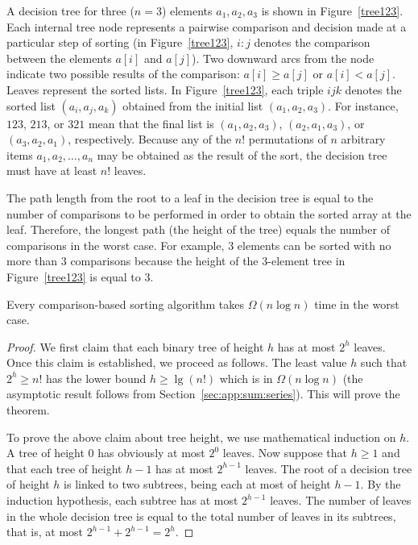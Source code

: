 \begin{Example} A decision tree for three ($n=3$)
elements $a_1, a_2, a_3$ is shown in Figure~\ref{tree123}. 
Each internal tree node represents a pairwise comparison and decision made at a
particular step of sorting (in Figure~\ref{tree123}, $i:j$ denotes 
the comparison between the elements $a[i]$ and $a[j]$). 
Two downward arcs from the node indicate two possible
results of the comparison: $a[i] \geq a[j]$ or $a[i] < a[j]$. 
Leaves represent the sorted lists. In Figure~\ref{tree123}, each triple
$ijk$ denotes the sorted list $(a_i,a_j,a_k)$ obtained from
the initial list $(a_1 ,a_2 , a_3)$. For instance, \(123\),
\(213\), or \(321\) mean that the final list
is $(a_1 ,a_2 , a_3)$, $(a_2, a_1, a_3)$, or 
$(a_3 , a_2, a_1)$, respectively. 
Because any of the $n!$ permutations of $n$ arbitrary items 
$a_1, a_2, \ldots, a_n$ may be obtained as the result of 
the sort, the decision tree must have at least $n!$ leaves.
\end{Example}

The path length from the root to a leaf in the decision tree is equal to the 
number of comparisons  to be performed in order to  obtain the sorted array at 
the leaf. Therefore, the longest path (the height of the tree) equals
the number of comparisons in the worst case. For example, $3$ elements 
can be sorted with no more than $3$ comparisons because the height of the 
$3$-element tree in Figure~\ref{tree123} is equal to $3$. 

\begin{Theorem} \label{t:worst}
Every comparison-based sorting algorithm takes $\Omega(n\log n)$ time in the 
worst case.
\end{Theorem}

\begin{proof} 
We first claim that each binary tree of height $h$ has at most $2^{h}$ leaves. 
Once this claim is established, we proceed as follows. The least value $h$ such 
that $2^{h} \ge n!$ has the lower bound $h \ge \lg (n!)$ which is in
$\Omega(n \log n )$ (the asymptotic result follows from 
Section~\ref{sec:app:sum:series}). This will prove the theorem.

To prove the above claim about tree height, we use mathematical induction on 
$h$. A tree of height $0$ has obviously at most $2^{0}$ leaves. Now suppose 
that $h\geq 1$ and that each tree of height $h-1$ has at most $2^{h-1}$ 
leaves. The root of a decision tree of  height $h$ is linked to two subtrees, 
being each at most of height $h-1$. By the induction hypothesis, each 
subtree has at most $2^{h-1}$ leaves. The number of leaves in the whole decision
tree is equal to the total number of leaves in its subtrees, that is,
at most $2^{h-1}+2^{h-1}=2^{h}$.
\end{proof}

